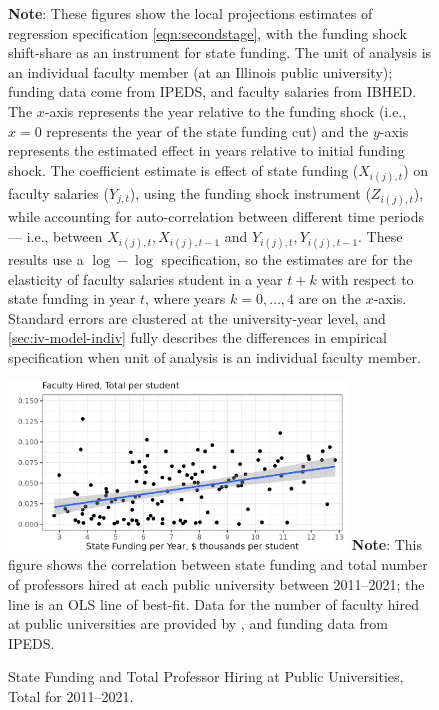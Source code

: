\begin{figure}[H]
\begin{subfigure}[b]{0.495\textwidth}
        \label{fig:salaries-administrator-illinois-lp-rolling}
    \end{subfigure}
    \label{fig:salaries-illinois-lp-rolling}
    \justify
    \footnotesize
    \textbf{Note}:
    These figures show the local projections estimates of regression specification \eqref{eqn:secondstage}, with the funding shock shift-share as an instrument for state funding.
    The unit of analysis is an individual faculty member (at an Illinois public university); funding data come from IPEDS, and faculty salaries from IBHED.
    The $x$-axis represents the year relative to the funding shock (i.e., $x = 0$ represents the year of the state funding cut) and the $y$-axis represents the estimated effect in years relative to initial funding shock.
    The coefficient estimate is effect of state funding ($X_{i(j),t}$) on faculty salaries ($Y_{j,t}$), using the funding shock instrument ($Z_{i(j),t}$), while accounting for auto-correlation between different time periods --- i.e., between $X_{i(j),t}, X_{i(j),t-1}$ and $Y_{i(j),t}, Y_{i(j),t-1}$.
    These results use a $\log-\log$ specification, so the estimates are for the elasticity of faculty salaries student in a year $t+k$ with respect to state funding in year $t$, where years $k = 0, \hdots, 4$ are on the $x$-axis. 
    Standard errors are clustered at the university-year level, and \autoref{sec:iv-model-indiv} fully describes the differences in empirical specification when unit of analysis is an individual faculty member.
\end{figure}

\newpage
\begin{figure}[H]
    \centering
    \singlespacing
    \caption{State Funding and Total Professor Hiring at Public Universities, Total for 2011--2021.}
    \includegraphics[width=0.8\textwidth]{figures/hiring-correlation.png}
    \label{fig:hiring-correlation}
    \justify
    \footnotesize
    \textbf{Note}:
    This figure shows the correlation between state funding and total number of professors hired at each public university between 2011--2021; the line is an OLS line of best-fit.
    Data for the number of faculty hired at public universities are provided by \cite{wapman2022quantifying,wapman2022zenodo}, and funding data from IPEDS.
\end{figure}




